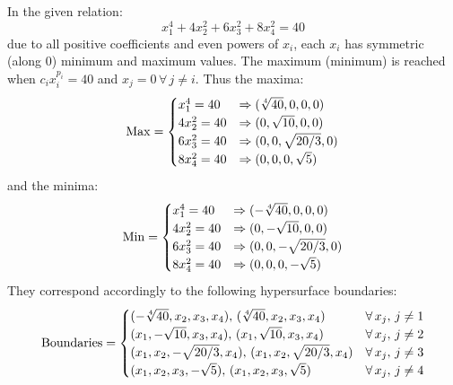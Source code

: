 \documentclass[a4paper]{article}
\begin{document}


In the given relation:
\begin{equation}
    x_1^4 + 4 x_2^2 + 6 x_3^2 + 8 x_4^2 = 40
\end{equation}
% 
due to all positive coefficients and even powers of $x_i$, each $x_i$ has
symmetric (along 0) minimum and maximum values. The maximum (minimum) is reached
when $c_i x_i^{p_i} = 40$ and $x_j = 0\, \forall\, j \ne i$. Thus the maxima:
% 
\begin{equation}
  {\rm Max} =
    \begin{cases}
      x_1^4 = 40 & \Rightarrow (\sqrt[4]{40}, 0, 0, 0) \\
      4 x_2^2 = 40 & \Rightarrow (0, \sqrt{10}, 0, 0) \\
      6 x_3^2 = 40 & \Rightarrow (0, 0, \sqrt{20/3}, 0) \\
      8 x_4^2 = 40 & \Rightarrow (0, 0, 0, \sqrt{5}) \\
    \end{cases}
\end{equation}
% 
and the minima:
% 
\begin{equation}
  {\rm Min} =
    \begin{cases}
      x_1^4 = 40 & \Rightarrow (-\sqrt[4]{40}, 0, 0, 0) \\
      4 x_2^2 = 40 & \Rightarrow (0, -\sqrt{10}, 0, 0) \\
      6 x_3^2 = 40 & \Rightarrow (0, 0, -\sqrt{20/3}, 0) \\
      8 x_4^2 = 40 & \Rightarrow (0, 0, 0, -\sqrt{5}) \\
    \end{cases}
\end{equation}
% 
They correspond accordingly to the following hypersurface boundaries:
% 
\begin{equation}
  {\rm Boundaries} =
    \begin{cases}
      (-\sqrt[4]{40}, x_2, x_3, x_4),\, (\sqrt[4]{40}, x_2, x_3, x_4) &  \forall\, x_j,\, j \ne 1\\
      (x_1, -\sqrt{10}, x_3, x_4),\, (x_1, \sqrt{10}, x_3, x_4) &  \forall\, x_j,\, j \ne 2\\
      (x_1, x_2, -\sqrt{20/3}, x_4),\, (x_1, x_2, \sqrt{20/3}, x_4) &  \forall\, x_j,\, j \ne 3\\
      (x_1, x_2, x_3, -\sqrt{5}),\, (x_1, x_2, x_3, \sqrt{5}) &  \forall\, x_j,\, j \ne 4\\
    \end{cases}
\end{equation}
\end{document}
